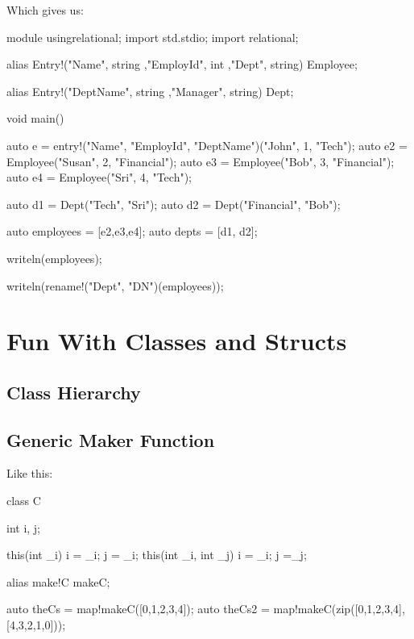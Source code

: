 Which gives us:

\begin{dcode}
module usingrelational;
import std.stdio;
import relational;

alias Entry!("Name",     string
            ,"EmployId", int
            ,"Dept", string) Employee;

alias Entry!("DeptName", string
            ,"Manager",  string) Dept;

void main()
{
    auto e = entry!("Name", "EmployId", "DeptName")("John", 1, "Tech");
    auto e2 = Employee("Susan", 2, "Financial");
    auto e3 = Employee("Bob", 3, "Financial");
    auto e4 = Employee("Sri", 4, "Tech");

    auto d1 = Dept("Tech", "Sri");
    auto d2 = Dept("Financial", "Bob");

    auto employees = [e2,e3,e4];
    auto depts = [d1, d2];

    writeln(employees);

    writeln(rename!("Dept", "DN")(employees));
}
\end{dcode}

\section{Fun With Classes and Structs}

\subsection{Class Hierarchy}\label{classhierarchy}


\subsection{Generic Maker Function}

Like this:

\begin{dcode}
class C
{
    int i, j;
    
    this(int _i) { i = _i; j = _i;}
    this(int _i, int _j) { i = _i; j =_j;}
}

alias make!C makeC;

auto theCs = map!makeC([0,1,2,3,4]);
auto theCs2 = map!makeC(zip([0,1,2,3,4], 
                            [4,3,2,1,0]));
\end{dcode}



